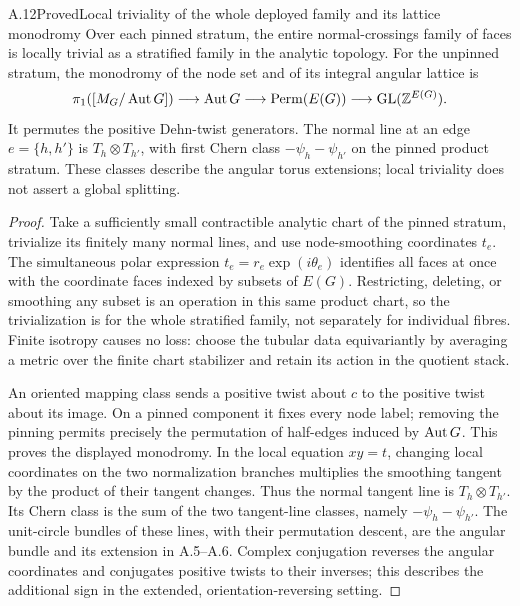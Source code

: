 \begin{result}{A.12}{Proved}{Local triviality of the whole deployed family and its lattice monodromy}
Over each pinned stratum, the entire normal-crossings family of faces is locally trivial as a stratified family in the analytic topology. For the unpinned stratum, the monodromy of the node set and of its integral angular lattice is
\[
 \pi_1([M_G/\operatorname{Aut} G])\longrightarrow\operatorname{Aut} G
 \longrightarrow\operatorname{Perm}(E(G))
 \longrightarrow\operatorname{GL}(\mathbb Z^{E(G)}).
\]
It permutes the positive Dehn-twist generators. The normal line at an edge $e=\{h,h'\}$ is $T_h\otimes T_{h'}$, with first Chern class $-\psi_h-\psi_{h'}$ on the pinned product stratum. These classes describe the angular torus extensions; local triviality does not assert a global splitting.
\end{result}
\begin{proof}
Take a sufficiently small contractible analytic chart of the pinned stratum, trivialize its finitely many normal lines, and use node-smoothing coordinates $t_e$. The simultaneous polar expression $t_e=r_e\exp(i\theta_e)$ identifies all faces at once with the coordinate faces indexed by subsets of $E(G)$. Restricting, deleting, or smoothing any subset is an operation in this same product chart, so the trivialization is for the whole stratified family, not separately for individual fibres. Finite isotropy causes no loss: choose the tubular data equivariantly by averaging a metric over the finite chart stabilizer and retain its action in the quotient stack.

An oriented mapping class sends a positive twist about $c$ to the positive twist about its image. On a pinned component it fixes every node label; removing the pinning permits precisely the permutation of half-edges induced by $\operatorname{Aut} G$. This proves the displayed monodromy. In the local equation $xy=t$, changing local coordinates on the two normalization branches multiplies the smoothing tangent by the product of their tangent changes. Thus the normal tangent line is $T_h\otimes T_{h'}$. Its Chern class is the sum of the two tangent-line classes, namely $-\psi_h-\psi_{h'}$. The unit-circle bundles of these lines, with their permutation descent, are the angular bundle and its extension in A.5--A.6. Complex conjugation reverses the angular coordinates and conjugates positive twists to their inverses; this describes the additional sign in the extended, orientation-reversing setting.
\end{proof}

